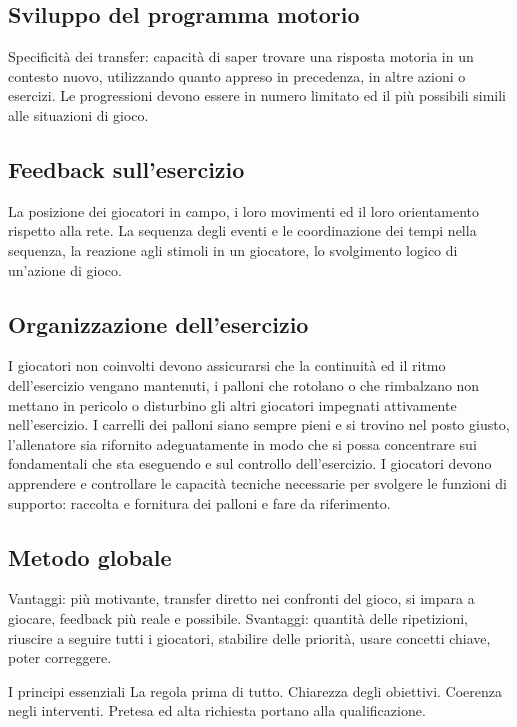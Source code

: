 \subsection{Sviluppo del programma motorio}
Specificità dei transfer: capacità di saper trovare una risposta motoria in un contesto nuovo, utilizzando quanto appreso in precedenza, in altre azioni o esercizi.
Le progressioni devono essere in numero limitato ed il più possibili simili alle situazioni di gioco.

\subsection{Feedback sull'esercizio}
La posizione dei giocatori in campo, i loro movimenti ed il loro orientamento rispetto alla rete.
La sequenza degli eventi e le coordinazione dei tempi nella sequenza, la reazione agli stimoli in un giocatore, lo svolgimento logico di un'azione di gioco.

\subsection{Organizzazione dell'esercizio}
I giocatori non coinvolti devono assicurarsi che la continuità ed il ritmo dell'esercizio vengano mantenuti, i palloni che rotolano o che rimbalzano non mettano in pericolo o disturbino gli altri giocatori impegnati attivamente nell'esercizio. I carrelli dei palloni siano sempre pieni e si trovino nel posto giusto, l'allenatore sia rifornito adeguatamente in modo che si possa concentrare sui fondamentali che sta eseguendo e sul controllo dell'esercizio.
I giocatori devono apprendere e controllare le capacità tecniche necessarie per svolgere le funzioni di supporto: raccolta e fornitura dei palloni e fare da riferimento.

\subsection{Metodo globale}
Vantaggi: più motivante, transfer diretto nei confronti del gioco, si impara a giocare, feedback più reale e possibile. 
Svantaggi: quantità delle ripetizioni, riuscire a seguire tutti i giocatori, stabilire delle priorità, usare concetti chiave, poter correggere.

I principi essenziali
La regola prima di tutto.
Chiarezza degli obiettivi.
Coerenza negli interventi.
Pretesa ed alta richiesta portano alla qualificazione.

